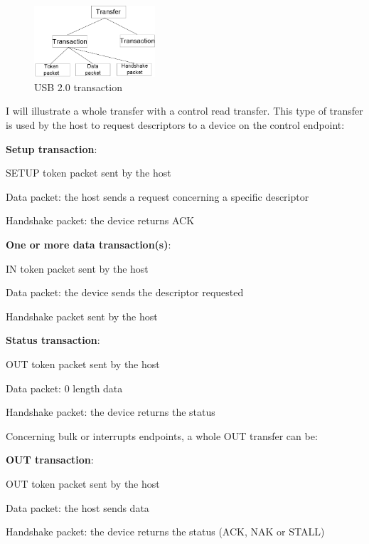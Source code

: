 \documentclass[pdftex,10pt,a4paper]{report}
\newenvironment{packed_item}{
\begin{itemize}
  \setlength{\itemsep}{1pt}
  \setlength{\parskip}{0pt}
  \setlength{\parsep}{0pt}
}{\end{itemize}}
\begin{document}
\begin{figure}[h!]
		\centering
		\includegraphics[width=0.4\textwidth]{./transfer.jpg}
		\caption{USB 2.0 transaction}
		\label{USB 2.0 transaction}
\end{figure}

I will illustrate a whole transfer with a control read transfer. This type of transfer is used by the host to request descriptors to a device on the control endpoint:
\begin{packed_item}
	\item \textbf{Setup transaction}:
	\begin{packed_item}
		\item SETUP token packet sent by the host
		\item Data packet: the host sends a request concerning a specific descriptor
		\item Handshake packet: the device returns ACK
	\end{packed_item}
	
	\item \textbf{One or more data transaction(s)}:
	\begin{packed_item}
		\item IN token packet sent by the host
		\item Data packet: the device sends the descriptor requested
		\item Handshake packet sent by the host
	\end{packed_item}
	
	
	\item \textbf{Status transaction}:
	\begin{packed_item}
		\item OUT token packet sent by the host
		\item Data packet: 0 length data
		\item Handshake packet: the device returns the status
	\end{packed_item}
	
\end{packed_item}


Concerning bulk or interrupts endpoints, a whole OUT transfer can be:
\begin{packed_item}
	\item \textbf{OUT transaction}:
	\begin{packed_item}
		\item OUT token packet sent by the host
		\item Data packet: the host sends data
		\item Handshake packet: the device returns the status (ACK, NAK or STALL)
	\end{packed_item}
\end{packed_item}
\end{document}
